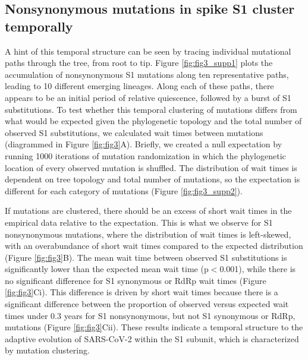 \documentclass[11pt,oneside,letterpaper]{article}
\begin{document}
\subsection*{Nonsynonymous mutations in spike S1 cluster temporally}
A hint of this temporal structure can be seen by tracing individual mutational paths through the tree, from root to tip. Figure \ref{fig:fig3_supp1} plots the accumulation of nonsynonymous S1 mutations along ten representative paths, leading to 10 different emerging lineages. Along each of these paths, there appears to be an initial period of relative quiescence, followed by a burst of S1 substitutions. To test whether this temporal clustering of mutations differs from what would be expected given the phylogenetic topology and the total number of observed S1 substitutions, we calculated wait times between mutations (diagrammed in Figure \ref{fig:fig3}A). Briefly, we created a null expectation by running 1000 iterations of mutation randomization in which the phylogenetic location of every observed mutation is shuffled. The distribution of wait times is dependent on tree topology and total number of mutations, so the expectation is different for each category of mutations (Figure \ref{fig:fig3_supp2}).

If mutations are clustered, there should be an excess of short wait times in the empirical data relative to the expectation. This is what we observe for S1 nonsynonymous mutations, where the distribution of wait times is left-skewed, with an overabundance of short wait times compared to the expected distribution (Figure \ref{fig:fig3}B). The mean wait time between observed S1 substitutions is significantly lower than the expected mean wait time (p$<$0.001), while there is no significant difference for S1 synonymous or RdRp wait times (Figure \ref{fig:fig3}Ci). This difference is driven by short wait times because there is a significant difference between the proportion of observed versus expected wait times under 0.3 years for S1 nonsynonymous, but not S1 synonymous or RdRp, mutations (Figure \ref{fig:fig3}Cii). These results indicate a temporal structure to the adaptive evolution of SARS-CoV-2 within the S1 subunit, which is characterized by mutation clustering.
\end{document}
